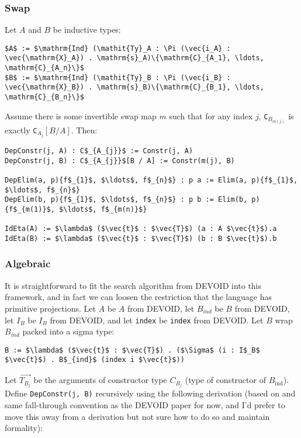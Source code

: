 \subsubsection{Swap}

Let $A$ and $B$ be inductive types:

\begin{lstlisting}
$A$ := $\mathrm{Ind} (\mathit{Ty}_A : \Pi (\vec{i_A} : \vec{\mathrm{X}_A}) . \mathrm{s}_A)\{\mathrm{C}_{A_1}, \ldots, \mathrm{C}_{A_n}\}$
$B$ := $\mathrm{Ind} (\mathit{Ty}_B : \Pi (\vec{i_B} : \vec{\mathrm{X}_B}) . \mathrm{s}_B)\{\mathrm{C}_{B_1}, \ldots, \mathrm{C}_{B_n}\}$
\end{lstlisting}		
Assume there is some invertible swap map $m$ such that for any index $j$,
\lstinline{C}$_{B_{m(j)}}$ is exactly \lstinline{C}$_{A_j}[B / A]$.
Then:

\begin{lstlisting}
DepConstr(j, A) : C$_{A_{j}}$ := Constr(j, A) 
DepConstr(j, B) : C$_{A_{j}}$[B / A] := Constr(m(j), B)

DepElim(a, p){f$_{1}$, $\ldots$, f$_{n}$} : p a := Elim(a, p){f$_{1}$, $\ldots$, f$_{n}$}
DepElim(b, p){f$_{1}$, $\ldots$, f$_{n}$} : p b := Elim(b, p){f$_{m(1)}$, $\ldots$, f$_{m(n)}$}

IdEta(A) := $\lambda$ ($\vec{t}$ : $\vec{T}$) (a : A $\vec{t}$).a
IdEta(B) := $\lambda$ ($\vec{t}$ : $\vec{T}$) (b : B $\vec{t}$).b
\end{lstlisting}

\subsubsection{Algebraic}

It is straightforward to fit the search algorithm from DEVOID into this framework, and in fact
we can loosen the restriction that the language has primitive projections.
Let $A$ be $A$ from DEVOID, let $B_{ind}$ be $B$ from DEVOID, let $I_B$ be $I_B$ from DEVOID,
and let \lstinline{index} be \lstinline{index} from DEVOID.
Let $B$ wrap $B_{ind}$ packed into a sigma type:

\begin{lstlisting}
B := $\lambda$ ($\vec{t}$ : $\vec{T}$) . ($\Sigma$ (i : I$_B$ $\vec{t}$) . B$_{ind}$ (index i $\vec{t}$))
\end{lstlisting}
Let $\vec{T_{B_j}}$ be the arguments of constructor type $C_{B_j}$ (type of constructor of $B_{\mathrm{ind}}$).
Define \lstinline{DepConstr(j, B)} recursively using the following derivation (based on and same fall-through convention as the DEVOID paper for now,
and I'd prefer to move this away from a derivation but not sure how to do so and maintain formality): %

